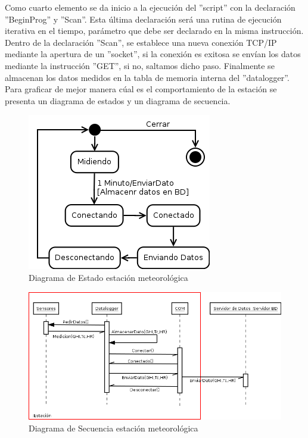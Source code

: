 Como cuarto elemento se da inicio a la ejecución del ''script'' con la declaración ''BeginProg'' y ''Scan''. Esta última declaración será una rutina de ejecución iterativa en el tiempo, parámetro que debe ser declarado en la misma instrucción.\\

Dentro de la declaración ''Scan'', se establece una nueva conexión TCP/IP mediante la apertura de un ''socket'', si la conexión es exitosa se envían los datos mediante la instrucción ''GET'', si no, saltamos dicho paso. Finalmente se almacenan los datos medidos en la tabla de memoria interna del ''datalogger''.\\

Para graficar de mejor manera cúal es el comportamiento de la estación se presenta un diagrama de estados y un diagrama de secuencia.

\begin{figure}[h!]
        \centering
        \includegraphics[scale=0.6]{images/estacionEstados}
        \caption{Diagrama de Estado estación meteorológica}
        \label{estacionEstados}
\end{figure}

\begin{figure}[h!]
        \centering
        \includegraphics[scale=0.5]{images/estacionSecuencia}
        \caption{Diagrama de Secuencia estación meteorológica}
        \label{despliegue}
\end{figure}


